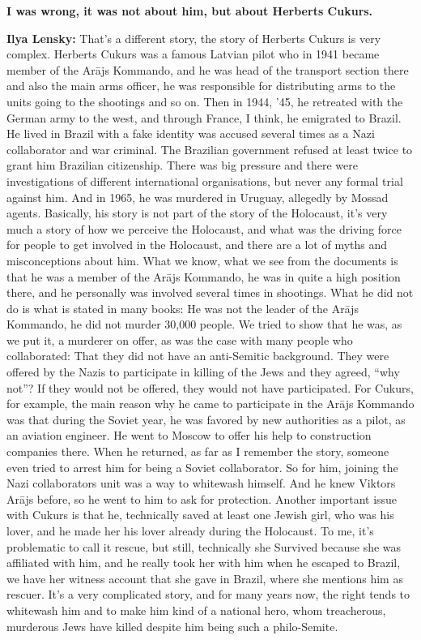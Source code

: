 \textbf{I was wrong, it was not about him, but about Herberts Cukurs.} 

\textbf{Ilya Lensky:} That’s a different story, the story of Herberts Cukurs is very complex. Herberts Cukurs was a famous Latvian pilot who in 1941 became member of the Arājs Kommando, and he was head of the transport section there and also the main arms officer, he was responsible for distributing arms to the units going to the shootings and so on. Then in 1944, '45, he retreated with the German army to the west, and through France, I think, he emigrated to Brazil. He lived in Brazil with a fake identity was accused several times as a Nazi collaborator and war criminal. The Brazilian government refused at least twice to grant him Brazilian citizenship. There was big pressure and there were investigations of different international organisations, but never any formal trial against him. And in 1965, he was murdered in Uruguay, allegedly by Mossad agents. Basically, his story is not part of the story of the Holocaust, it’s very much a story of how we perceive the Holocaust, and what was the driving force for people to get involved in the Holocaust, and there are a lot of myths and misconceptions about him. What we know, what we see from the documents is that he was a member of the Arājs Kommando, he was in quite a high position there, and he personally was involved several times in shootings. What he did not do is what is stated in many books: He was not the leader of the Arājs Kommando, he did not murder 30,000 people. We tried to show that he was, as we put it, a murderer on offer, as was the case with many people who collaborated: That they did not have an anti-Semitic background. They were offered by the Nazis to participate in killing of the Jews and they agreed, ``why not''? If they would not be offered, they would not have participated. For Cukurs, for example, the main reason why he came to participate in the Arājs Kommando was that during the Soviet year, he was favored by new authorities as a pilot, as an aviation engineer. He went to Moscow to offer his help to construction companies there. When he returned, as far as I remember the story, someone even tried to arrest him for being a Soviet collaborator. So for him, joining the Nazi collaborators unit was a way to whitewash himself. And he knew Viktors Arājs before, so he went to him to ask for protection. Another important issue with Cukurs is that he, technically saved at least one Jewish girl, who was his lover, and he made her his lover already during the Holocaust. To me, it’s problematic to call it rescue, but still, technically she Survived because she was affiliated with him, and he really took her with him when he escaped to Brazil, we have her witness account that she gave in Brazil, where she mentions him as rescuer. It’s a very complicated story, and for many years now, the right tends to whitewash him and to make him kind of a national hero, whom treacherous, murderous Jews have killed despite him being such a philo-Semite. \\
